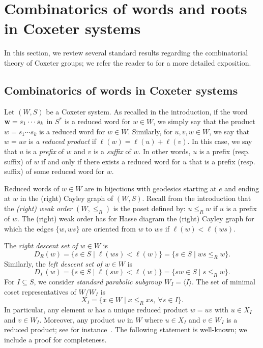 \documentclass{amsart}
\theoremstyle{definition}
\begin{document}
\section{Combinatorics of words and roots in Coxeter systems}\label{sec:root-poset}

In this section, we review several standard results regarding the combinatorial theory of Coxeter groups; we refer the reader to \cite{BB} for a more detailed exposition.

\subsection{Combinatorics of words in Coxeter systems} Let $(W,S)$ be a Coxeter system. As recalled in the introduction, if the word ${\bf w}=s_1 \cdots  s_k$ in $S^*$ is a reduced word for $w\in W$, we simply say that the product  $w=s_1\cdots s_k$ is a reduced word for $w\in W$. Similarly, for $u, v, w \in W$, we say that $w = uv$ is \textit{a reduced product} if $\ell(w) = \ell(u) + \ell(v)$. In this case,  we say that $u$ is a \textit{prefix} of $w$ and $v$ is a \textit{suffix} of $w$. In other words, $u$ is a prefix (resp. suffix) of $w$ if and only if there exists a reduced word for $u$ that is a prefix (resp. suffix) of some reduced word for $w$. 

\smallskip

Reduced words of $w\in W$ are in bijections with geodesics starting at $e$ and ending at $w$ in the (right) Cayley graph of $(W,S)$. Recall from the introduction that the \textit{(right) weak order} $(W,\leq_R)$ is the poset defined by: $u \leq_R w$ if $u$ is a prefix of $w$. The (right) weak order has for Hasse diagram the (right) Cayley graph for which the edges $\{w,ws\}$ are oriented from $w$ to $ws$ if $\ell(w)<\ell(ws)$. 

The {\em right descent set of $w\in W$} is 
$$
D_R(w)=\{s\in S\mid \ell(ws)<\ell(w)\}=\{s\in S\mid ws\leq_R w\}.
$$ 
Similarly, the {\em left descent set of $w\in W$} is 
$$
D_L(w)=\{s\in S\mid \ell(sw)<\ell(w)\}=\{sw\in S\mid s\leq_R w\}.
$$
For $I\subseteq S$, we consider {\em standard parabolic subgroup $W_I=\langle I\rangle$}. The set of minimal coset representatives of $W/W_I$ is 
$$
X_I=\{x\in W\mid x\leq_R xs,\ \forall s\in I\}.
$$
In particular, any element $w$ has a unique reduced product $w=uv$ with $u\in X_I$ and $v\in W_I$. Moreover, any product $uv$ in $W$ where  $u\in X_I$ and $v\in W_I$ is a reduced product; see for instance~\cite[Proposition~2.4.4]{BB}. 
The following statement is well-known; we include a proof for completeness. 
\end{document}
